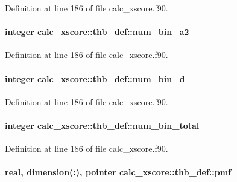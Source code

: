 Definition at line 186 of file calc\-\_\-xscore.\-f90.

\hypertarget{structcalc__xscore_1_1thb__def_a6177343713c10a4be205ac6909a97171}{
\paragraph[{num\-\_\-bin\-\_\-a2}]{\setlength{\rightskip}{0pt plus 5cm}integer calc\-\_\-xscore\-::thb\-\_\-def\-::num\-\_\-bin\-\_\-a2}}\label{structcalc__xscore_1_1thb__def_a6177343713c10a4be205ac6909a97171}


Definition at line 186 of file calc\-\_\-xscore.\-f90.

\hypertarget{structcalc__xscore_1_1thb__def_ab89eb40cf6463f9a3f73d53941021b0a}{
\paragraph[{num\-\_\-bin\-\_\-d}]{\setlength{\rightskip}{0pt plus 5cm}integer calc\-\_\-xscore\-::thb\-\_\-def\-::num\-\_\-bin\-\_\-d}}\label{structcalc__xscore_1_1thb__def_ab89eb40cf6463f9a3f73d53941021b0a}


Definition at line 186 of file calc\-\_\-xscore.\-f90.

\hypertarget{structcalc__xscore_1_1thb__def_ac25e97b1218aaf44a54e4a9014893e59}{
\paragraph[{num\-\_\-bin\-\_\-total}]{\setlength{\rightskip}{0pt plus 5cm}integer calc\-\_\-xscore\-::thb\-\_\-def\-::num\-\_\-bin\-\_\-total}}\label{structcalc__xscore_1_1thb__def_ac25e97b1218aaf44a54e4a9014893e59}


Definition at line 186 of file calc\-\_\-xscore.\-f90.

\hypertarget{structcalc__xscore_1_1thb__def_af52e0808cb910b34d054894c26308569}{
\paragraph[{pmf}]{\setlength{\rightskip}{0pt plus 5cm}real, dimension(\-:), pointer calc\-\_\-xscore\-::thb\-\_\-def\-::pmf}}\label{structcalc__xscore_1_1thb__def_af52e0808cb910b34d054894c26308569}


